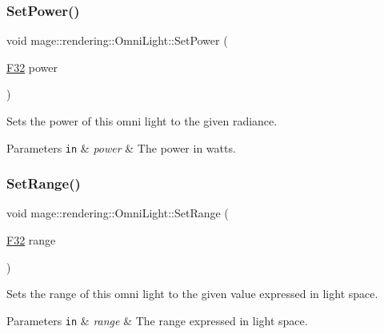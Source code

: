 \subsubsection{\texorpdfstring{Set\+Power()}{SetPower()}}
{\footnotesize\ttfamily void mage\+::rendering\+::\+Omni\+Light\+::\+Set\+Power (\begin{DoxyParamCaption}\item[{\hyperlink{namespacemage_aa97e833b45f06d60a0a9c4fc22ae02c0}{F32}}]{power }\end{DoxyParamCaption})\hspace{0.3cm}{\ttfamily [noexcept]}}

Sets the power of this omni light to the given radiance.


\begin{DoxyParams}[1]{Parameters}
\mbox{\tt in}  & {\em power} & The power in watts. \\
\hline
\end{DoxyParams}
\hypertarget{classmage_1_1rendering_1_1_omni_light_a71d9cbef05c421a154b202e7a9b8eedb}{}\label{classmage_1_1rendering_1_1_omni_light_a71d9cbef05c421a154b202e7a9b8eedb} 
\subsubsection{\texorpdfstring{Set\+Range()}{SetRange()}}
{\footnotesize\ttfamily void mage\+::rendering\+::\+Omni\+Light\+::\+Set\+Range (\begin{DoxyParamCaption}\item[{\hyperlink{namespacemage_aa97e833b45f06d60a0a9c4fc22ae02c0}{F32}}]{range }\end{DoxyParamCaption})\hspace{0.3cm}{\ttfamily [noexcept]}}

Sets the range of this omni light to the given value expressed in light space.


\begin{DoxyParams}[1]{Parameters}
\mbox{\tt in}  & {\em range} & The range expressed in light space. \\
\hline
\end{DoxyParams}
\hypertarget{classmage_1_1rendering_1_1_omni_light_a2817ab7a4c514785f01bf2e40c6245cb}{}\label{classmage_1_1rendering_1_1_omni_light_a2817ab7a4c514785f01bf2e40c6245cb} 

